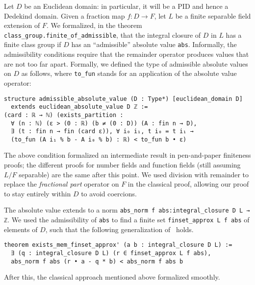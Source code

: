 \documentclass[a4paper,USenglish,cleveref, autoref, thm-restate]{lipics-v2021}
\newcommand{\lean}[1]{\texttt{#1}\xspace} %
\begin{document}
Let $D$ be an Euclidean domain: in particular, it will be a PID and hence a Dedekind domain. Given a fraction map $f \colon D \to F$, let $L$ be a finite separable field extension of $F$.
We formalized, in the theorem \lean{class\_group.finite\_of\_admissible}, that the integral closure of $D$ in $L$ has a finite class group if $D$ has an ``admissible'' absolute value \lean{abs}.
Informally, the admissibility conditions require that the remainder operator produces values that are not too far apart.
Formally, we defined the type of admissible absolute values on $D$ as follows, where \lean{to\_fun} stands for an application of the absolute value operator:
\pagebreak[3] %
\begin{lstlisting}
structure admissible_absolute_value (D : Type*) [euclidean_domain D]
  extends euclidean_absolute_value D ℤ :=
(card : ℝ → ℕ) (exists_partition :
  ∀ (n : ℕ) (ε > (0 : ℝ) (b ≠ (0 : D)) (A : fin n → D),
  ∃ (t : fin n → fin (card ε)), ∀ i₀ i₁, t i₀ = t i₁ →
  (to_fun (A i₁ % b - A i₀ % b) : ℝ) < to_fun b • ε)
\end{lstlisting}

The above condition formalized an intermediate result in pen-and-paper finiteness proofs;
the different proofs for number fields and function fields (still assuming $L/F$ separable) are the same after this point.
We used division with remainder to replace the \emph{fractional part} operator on $F$ in the classical proof,
allowing our proof to stay entirely within $D$ to avoid coercions.

The absolute value extends to a norm \lean{abs\_norm f abs:integral\_closure D L → ℤ}.
We used the admissibility of \lean{abs} to find a finite set \lean{finset\_approx L f abs} of elements of $D$,
such that the following generalization of~\cite[Theorem~12.2.1]{Ireland-Rosen} holds.
\begin{lstlisting}
theorem exists_mem_finset_approx' (a b : integral_closure D L) :=
  ∃ (q : integral_closure D L) (r ∈ finset_approx L f abs),
  abs_norm f abs (r • a - q * b) < abs_norm f abs b
\end{lstlisting}
After this, the classical approach mentioned above formalized smoothly.
\end{document}
